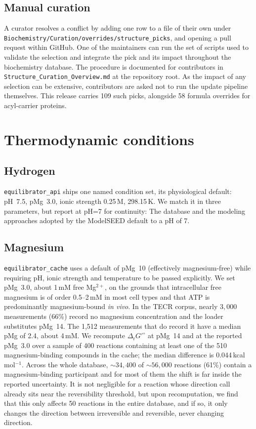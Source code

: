 \documentclass[11pt]{article}
\newcommand{\drGo}{$\Delta_{\mathrm{r}}G'^{\circ}$}
\begin{document}
\subsection{Manual curation} A curator resolves a conflict by adding one row to a file of their own under \texttt{Biochemistry/\allowbreak Curation/\allowbreak overrides/\allowbreak structure\_picks}, and opening a pull request within GitHub. One of the maintainers can run the set of scripts used to validate the selection and integrate the pick and its impact throughout the biochemistry database. The procedure is documented for contributors in \texttt{Structure\_Curation\_Overview.md} at the repository root. As the impact of any selection can be extensive, contributors are asked not to run the update pipeline themselves. This release carries 109 such picks, alongside 58 formula overrides for acyl-carrier proteins.

\section{Thermodynamic conditions}\label{sec:s2}

\subsection{Hydrogen} \texttt{equilibrator\_api} ships one named condition set, its physiological default: pH~7.5, pMg~3.0, ionic strength 0.25\,M, 298.15\,K. We match it in three parameters, but report at pH=7 for continuity: The database and the modeling approaches adopted by the ModelSEED default to a pH of 7.

\subsection{Magnesium} \texttt{equilibrator\_cache} uses a default of pMg~10 (effectively magnesium-free) while requiring pH, ionic strength and temperature to be passed explicitly. We set pMg~3.0, about 1\,mM free Mg$^{2+}$, on the grounds that intracellular free magnesium is of order 0.5--2\,mM in most cell types and that ATP is predominantly magnesium-bound \emph{in vivo}. In the TECR corpus, nearly $3,000$ measurements (66\%) record no magnesium concentration and the loader substitutes pMg~14. The 1,512 measurements that do record it have a median pMg of 2.4, about 4\,mM. We recompute \drGo{} at pMg~14 and at the reported pMg~3.0 over a sample of 400 reactions containing at least one of the 510 magnesium-binding compounds in the cache; the median difference is 0.044\,kcal\,mol$^{-1}$. Across the whole database, $\sim34,400$ of $\sim56,000$ reactions (61\%) contain a magnesium-binding participant and for most of them the shift is far inside the reported uncertainty. It is not negligible for a reaction whose direction call already sits near the reversibility threshold, but upon recomputation, we find that this only affects 50 reactions in the entire database, and if so, it only changes the direction between irreversible and reversible, never changing direction.
\end{document}
